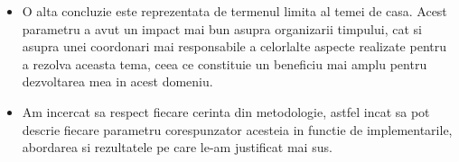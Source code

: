 \documentclass{article}
\begin{document}
\begin{flushleft}
\begin{itemize}
       \vspace{2mm}
       \item O alta concluzie este reprezentata de termenul limita al temei de casa. Acest parametru a avut un impact mai bun asupra organizarii timpului, cat si asupra unei coordonari mai responsabile a celorlalte aspecte realizate pentru a rezolva aceasta tema, ceea ce constituie un beneficiu mai amplu pentru dezvoltarea mea in acest domeniu.
       \vspace{2mm}
       \item  Am incercat sa respect fiecare cerinta din metodologie, astfel incat sa pot descrie fiecare parametru corespunzator acesteia in functie de implementarile, abordarea si rezultatele pe care le-am justificat mai sus.
    \end{itemize}
\end{flushleft}
\end{document}

